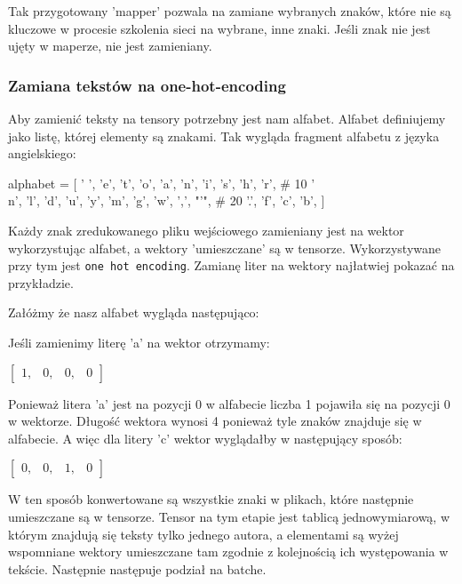 Tak przygotowany 'mapper' pozwala na zamiane wybranych znaków, które nie są kluczowe w procesie 
szkolenia sieci na wybrane, inne znaki. Jeśli znak nie jest ujęty w maperze, nie jest zamieniany. 

\subsubsection{Zamiana tekstów na one-hot-encoding}
Aby zamienić teksty na tensory potrzebny jest nam alfabet. Alfabet definiujemy jako listę, której 
elementy są znakami. Tak wygląda fragment alfabetu z języka angielskiego:
\begin{python}
alphabet = [
    ' ',
    'e',
    't',
    'o',
    'a',
    'n',
    'i',
    's',
    'h',
    'r',  # 10
    '\\n',
    'l',
    'd',
    'u',
    'y',
    'm',
    'g',
    'w',
    ',',
    "'",  # 20
    '.',
    'f',
    'c',
    'b',
]
\end{python}

Każdy znak zredukowanego pliku wejściowego zamieniany jest na wektor wykorzystując alfabet, 
a wektory 'umieszczane' są w tensorze. Wykorzystywane przy tym jest \texttt{one hot encoding}.
Zamianę liter na wektory najłatwiej pokazać na przykładzie.

Załóżmy że nasz alfabet wygląda następująco:

Jeśli zamienimy literę 'a' na wektor otrzymamy: 
 
\vspace{2mm}
$
\begin{bmatrix} 
1, & 0, & 0, & 0
\end{bmatrix} 
$
\vspace{2mm}

Ponieważ litera 'a' jest na pozycji 0 w alfabecie liczba 1 pojawiła się na pozycji 0 w wektorze.
Długość wektora wynosi 4 ponieważ tyle znaków znajduje się w alfabecie. A więc dla litery 
'c' wektor wyglądałby w następujący sposób:

\vspace{2mm}
$
\begin{bmatrix} 
0, & 0, & 1, & 0
\end{bmatrix} 
$
\vspace{2mm}

W ten sposób konwertowane są wszystkie znaki w plikach, które następnie umieszczane są w tensorze.
Tensor na tym etapie jest tablicą jednowymiarową, w którym znajdują się teksty tylko jednego autora, 
a elementami są wyżej wspomniane wektory umieszczane tam zgodnie z kolejnością ich występowania w tekście. 
Następnie następuje podział na batche.